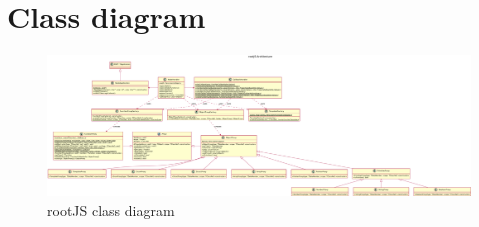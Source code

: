 \section{Class diagram} %

\begin{figure}[htb]
	\centering
	\includegraphics[width=\textheight, height=\linewidth, angle={90}, keepaspectratio]{./latex/resources/architecture.pdf}
	\caption{rootJS class diagram}
\end{figure}

\pagebreak
